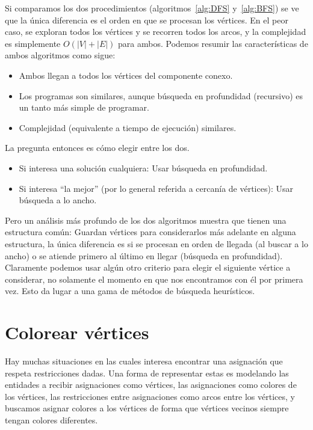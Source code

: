   Si comparamos los dos procedimientos
  (algoritmos~\ref{alg:DFS} y~\ref{alg:BFS})%
  se ve que la única diferencia
  es el orden en que se procesan los vértices.
  En el peor caso,
  se exploran todos los vértices
  y se recorren todos los arcos,
  y la complejidad
  es simplemente \(O(\lvert V \rvert + \lvert E \rvert)\)
  para ambos.
  Podemos resumir las características de ambos algoritmos
  como sigue:
  \begin{itemize}
    \item
      Ambos llegan a todos los vértices del componente conexo.
    \item
      Los programas son similares,
      aunque búsqueda en profundidad (recursivo)
      es un tanto más simple de programar.
    \item
      Complejidad (equivalente a tiempo de ejecución) similares.
  \end{itemize}

  La pregunta entonces es cómo elegir entre los dos.
  \begin{itemize}
    \item
      Si interesa una solución cualquiera:
      Usar búsqueda en profundidad.
    \item
      Si interesa ``la mejor''
      (por lo general referida a cercanía de vértices):
      Usar búsqueda a lo ancho.
  \end{itemize}

  Pero un análisis más profundo de los dos algoritmos
  muestra que tienen una estructura común:
  Guardan vértices para considerarlos más adelante
  en alguna estructura,
  la única diferencia es si se procesan en orden de llegada
  (al buscar a lo ancho)
  o se atiende primero al último en llegar
  (búsqueda en profundidad).
  Claramente podemos usar algún otro criterio
  para elegir el siguiente vértice a considerar,
  no solamente el momento
  en que nos encontramos con él por primera vez.
  Esto da lugar a una gama de métodos de búsqueda heurísticos.

%

\section{Colorear vértices}
\label{sec:colorear-vertices}

  Hay muchas situaciones
  en las cuales interesa encontrar una asignación
  que respeta restricciones dadas.
  Una forma de representar estas
  es modelando las entidades a recibir asignaciones
  como vértices,
  las asignaciones como colores de los vértices,
  las restricciones entre asignaciones
  como arcos entre los vértices,
  y buscamos asignar colores
  a los vértices de forma que vértices vecinos
  siempre tengan colores diferentes.

